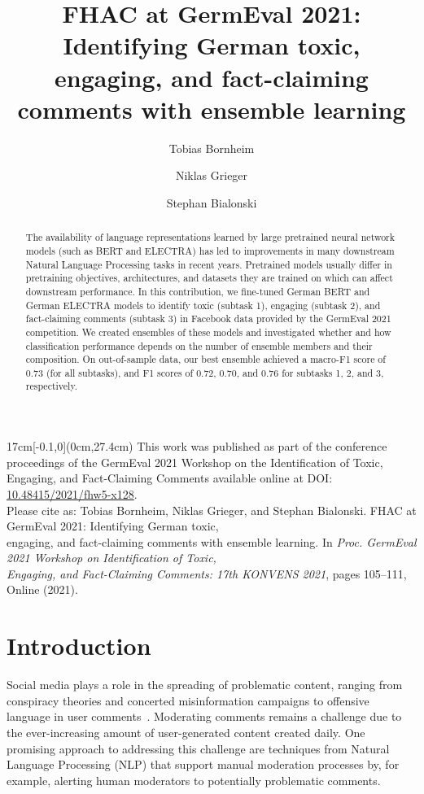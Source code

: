\documentclass[11pt,a4paper]{article}
\title{FHAC at GermEval 2021: Identifying German toxic, engaging, and fact-claiming comments with ensemble learning}
\author[1]{Tobias Bornheim}
\author[1]{Niklas Grieger}
\author[1,2,*]{Stephan Bialonski}
\affil[1]{Department of Medical Engineering and Technomathematics\authorcr
FH Aachen University of Applied Sciences, Jülich, Germany\authorcr}
\affil[2]{Institute for Data-Driven Technologies\authorcr
FH Aachen University of Applied Sciences, Jülich, Germany}
\affil[*]{\textit{bialonski@fh-aachen.de}}
\date{}
\begin{document}
\maketitle
\begin{abstract}
The availability of language representations learned by large pretrained neural network models (such as BERT and ELECTRA) has led to improvements in many downstream Natural Language Processing tasks in recent years. Pretrained models usually differ in pretraining objectives, architectures, and datasets they are trained on which can affect downstream performance.
In this contribution, we fine-tuned German BERT and German \mbox{ELECTRA} models to identify toxic (subtask 1), engaging (subtask 2), and \mbox{fact-claiming} comments (subtask 3) in Facebook data provided by the GermEval 2021 competition. We created ensembles of these models and investigated whether and how classification performance depends on the number of ensemble members and their composition.
On \mbox{out-of-sample} data, our best ensemble achieved a macro-F1 score of $0.73$ (for all subtasks), and F1 scores of $0.72$, $0.70$, and $0.76$ for subtasks 1, 2, and 3, respectively.
\end{abstract}


\begin{textblock*}{17cm}[-0.1,0](0cm,27.4cm)
    \centering
    \small
    This work was published as part of the conference proceedings of the GermEval 2021 Workshop on the Identification of Toxic, \\Engaging, and Fact-Claiming Comments available online at DOI: \href{https://dx.doi.org/10.48415/2021/fhw5-x128}{10.48415/2021/fhw5-x128}. \\
    Please cite as: Tobias Bornheim, Niklas Grieger, and Stephan Bialonski. FHAC at GermEval 2021: Identifying German toxic, \\engaging, and fact-claiming comments with ensemble learning. In \textit{Proc. GermEval 2021 Workshop on Identification of Toxic, \\Engaging, and Fact-Claiming Comments: 17th KONVENS 2021}, pages 105--111, Online (2021).
\end{textblock*}


\section{Introduction}
Social media plays a role in the spreading of problematic content, ranging from conspiracy theories and concerted misinformation campaigns to offensive language in user comments~\citep{Zhuravskaya2020}. Moderating comments remains a challenge due to the ever-increasing amount of user-generated content created daily. One promising approach to addressing this challenge are techniques from Natural Language Processing (NLP) that support manual moderation processes by, for example, alerting human moderators to potentially problematic comments.
\end{document}
